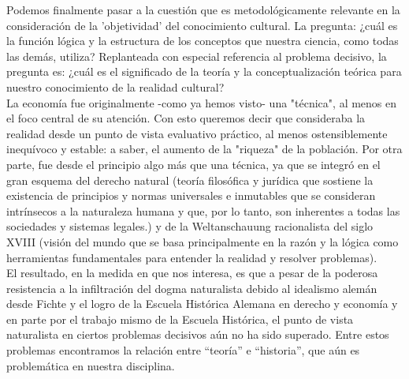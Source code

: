 Podemos finalmente pasar a la cuestión que es metodológicamente relevante en la consideración de la 'objetividad' del conocimiento cultural. La pregunta: ¿cuál es la función lógica y la estructura de los conceptos que nuestra ciencia, como todas las demás, utiliza? Replanteada con especial referencia al problema decisivo, la pregunta es: ¿cuál es el significado de la teoría y la conceptualización teórica para nuestro conocimiento de la realidad cultural?\\
La economía fue originalmente -como ya hemos visto- una "técnica", al menos en el foco central de su atención. Con esto queremos decir que consideraba la realidad desde un punto de vista evaluativo práctico, al menos ostensiblemente inequívoco y estable: a saber, el aumento de la "riqueza" de la población. Por otra parte, fue desde el principio algo más que una técnica, ya que se integró en el gran esquema del derecho natural (teoría filosófica y jurídica que sostiene la existencia de principios y normas universales e inmutables que se consideran intrínsecos a la naturaleza humana y que, por lo tanto, son inherentes a todas las sociedades y sistemas legales.) y de la Weltanschauung racionalista del siglo XVIII (visión del mundo que se basa principalmente en la razón y la lógica como herramientas fundamentales para entender la realidad y resolver problemas).\\

 El resultado, en la medida en que nos interesa, es que a pesar de la poderosa resistencia a la infiltración del dogma naturalista debido al idealismo alemán desde Fichte y el logro de la Escuela Histórica Alemana en derecho y economía y en parte por el trabajo mismo de la Escuela Histórica, el punto de vista naturalista en ciertos problemas decisivos aún no ha sido superado. Entre estos problemas encontramos la relación entre “teoría” e “historia”, que aún es problemática en nuestra disciplina.\\

